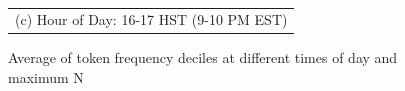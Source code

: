 \documentclass[letterpaper,12pt,titlepage,oneside,final]{book}
\begin{document}
\begin{figure}
{}
\\
\begin{tabular}{c}
\\(c) Hour of Day: 16-17 HST (9-10 PM EST)
\end{tabular}
\caption{Average of token frequency deciles at different times of day and maximum N} %
\label{fig:ngramsDist}
\end{figure} 
\end{document}
